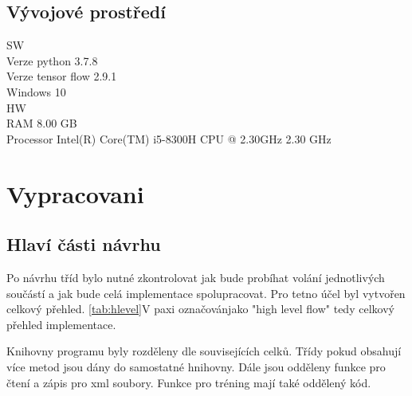 \documentclass[
  program=ainfk,
  biblatex,
  language=czech,
  figures=true,
  tables ,
  sourcecodes=true,
  glossaries=true,
  index
]{kidiplom}
\begin{document}
\subsection{Vývojové  prostředí }

SW   \\
Verze python 3.7.8  \\
Verze tensor flow 2.9.1  \\
Windows 10 \\
HW  \\ 
RAM 8.00 GB  \\
Processor   Intel(R) Core(TM) i5-8300H CPU @ 2.30GHz   2.30 GHz  \\
 

\section{Vypracovani }

\subsection{Hlaví části návrhu }

Po návrhu tříd bylo nutné zkontrolovat jak bude probíhat volání jednotlivých součástí a jak bude celá implementace spolupracovat. Pro tetno účel byl vytvořen celkový přehled. \ref{tab:hlevel}V paxi označovánjako "high level flow" tedy celkový přehled implementace. 

Knihovny programu byly rozděleny dle souvisejících celků. Třídy pokud obsahují více metod jsou dány do samostatné hnihovny. Dále jsou odděleny funkce pro čtení a zápis pro xml soubory. Funkce pro tréning mají také oddělený kód. \\
  
\end{document}
